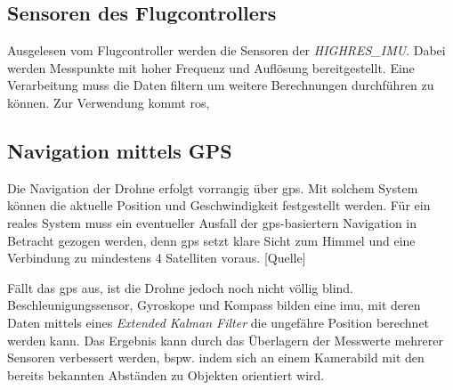 \subsection{Sensoren des Flugcontrollers}
Ausgelesen vom Flugcontroller werden die Sensoren der \textit{HIGHRES\_IMU}. Dabei werden Messpunkte mit hoher Frequenz und Auflösung bereitgestellt. Eine Verarbeitung muss die Daten filtern um weitere Berechnungen durchführen zu können. Zur Verwendung kommt \gls{ros}, 

\subsection{Navigation mittels GPS}
Die Navigation der Drohne erfolgt vorrangig über \gls{gps}. Mit solchem System können die aktuelle Position und Geschwindigkeit festgestellt werden. Für ein reales System muss ein eventueller Ausfall der \gls{gps}-basiertern Navigation in Betracht gezogen werden, denn \gls{gps} setzt klare Sicht zum Himmel und eine Verbindung zu mindestens 4 Satelliten voraus. [Quelle]

Fällt das \gls{gps} aus, ist die Drohne jedoch noch nicht völlig blind. Beschleunigungssensor, Gyroskope und Kompass bilden eine \gls{imu}, mit deren Daten mittels eines \textit{Extended Kalman Filter} die ungefähre Position berechnet werden kann. Das Ergebnis kann durch das Überlagern der Messwerte mehrerer Sensoren verbessert werden, bspw. indem sich an einem Kamerabild mit den bereits bekannten Abständen zu Objekten orientiert wird. 


